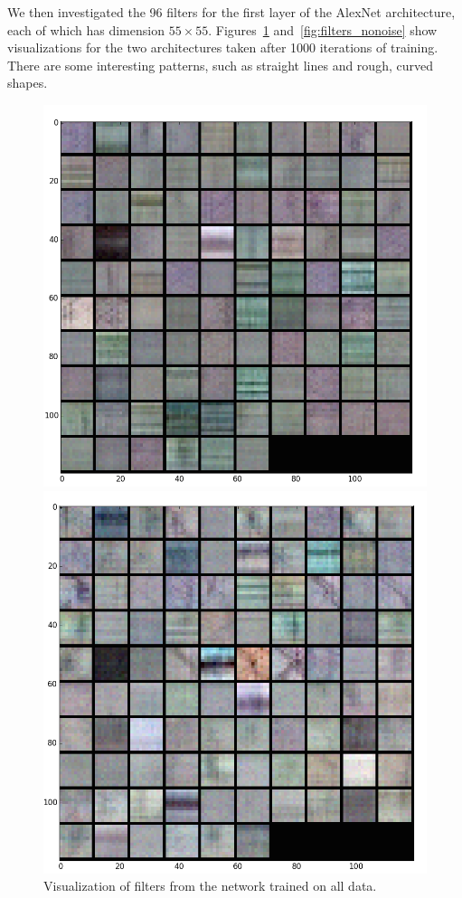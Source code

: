 \documentclass[10pt]{article}
\begin{document}
We then investigated the 96 filters for the first layer of the AlexNet architecture, each of which
has dimension $55\times 55$. Figures~\ref{fig:filters_all} and~\ref{fig:filters_nonoise} show
visualizations for the two architectures taken after 1000 iterations of training. There are some
interesting patterns, such as straight lines and rough, curved shapes.

\begin{figure}[t]
\centering
  \begin{minipage}{.35\textwidth}
  \centering
  \includegraphics[width=1\linewidth]{Filters_All1000}
  \caption{Visualization of filters from the network trained on all data.}
  \label{fig:filters_all}
  \end{minipage}\hfill
  \begin{minipage}{.35\textwidth}
  \centering
  \includegraphics[width=1\linewidth]{Filters_NoNoise1000}

\end{minipage}
\end{figure}
\end{document}
